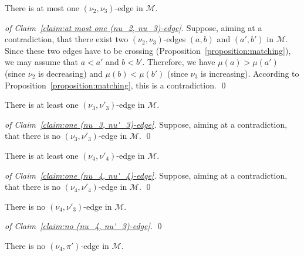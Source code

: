 \documentclass[a4paper,10pt]{llncs}
\begin{document}
\begin{claim}
  \label{claim:at most one (nu_2, nu_3)-edge}
  There is at most one $(\nu_2, \nu_3)$-edge
  in $\mathcal{M}$.
\end{claim}

\begin{proof}[of Claim~\ref{claim:at most one (nu_2, nu_3)-edge}]
  Suppose, aiming at a contradiction, that there exist two
  $(\nu_2, \nu_3)$-edges $(a, b)$ and $(a', b')$ in $\mathcal{M}$.
  Since these two edges have to be crossing
  (Proposition~\ref{proposition:matching}), we may assume that
  $a < a'$ and $b < b'$.
  Therefore, we have
  $\mu(a) > \mu(a')$ (since $\nu_2$ is decreasing)
  and
  $\mu(b) < \mu(b')$ (since $\nu_3$ is increasing).
  According to Proposition~\ref{proposition:matching}, this is
  a contradiction.
  \qed
\end{proof}

\begin{claim}
  \label{claim:one (nu_3, nu'_3)-edge}
  There is at least one $(\nu_3, \nu'_3)$-edge in $\mathcal{M}$.
\end{claim}

\begin{proof}[of Claim~\ref{claim:one (nu_3, nu'_3)-edge}]
  Suppose, aiming at a contradiction, that there is no
  $(\nu_3, \nu'_3)$-edge in $\mathcal{M}$.
  \qed
\end{proof}

\begin{claim}
  \label{claim:one (nu_4, nu'_4)-edge}
  There is at least one $(\nu_4, \nu'_4)$-edge in $\mathcal{M}$.
\end{claim}

\begin{proof}[of Claim~\ref{claim:one (nu_4, nu'_4)-edge}]
  Suppose, aiming at a contradiction, that there is no
  $(\nu_4, \nu'_4)$-edge in $\mathcal{M}$.
  \qed
\end{proof}

\begin{claim}
  \label{claim:no (nu_4, nu'_3)-edge}
  There is no $(\nu_4, \nu'_3)$-edge in $\mathcal{M}$.
\end{claim}

\begin{proof}[of Claim~\ref{claim:no (nu_4, nu'_3)-edge}]
  \qed
\end{proof}

\begin{claim}
  \label{claim:no (nu_4, pi')-edge}
  There is no $(\nu_4, \pi')$-edge in $\mathcal{M}$.
\end{claim}
\end{document}
